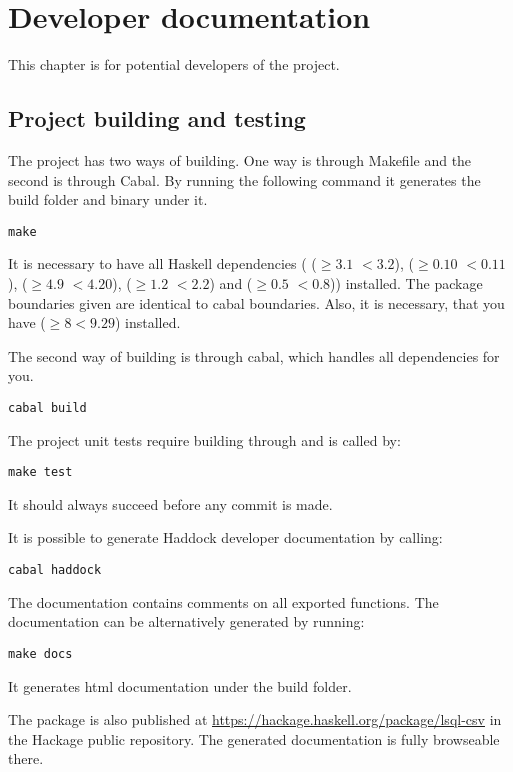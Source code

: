 \chapter{Developer documentation}
This chapter is for potential developers of the project.

\section{Project building and testing}
The project has two ways of building. One way is through Makefile and the second is through Cabal. 
By running the following command it generates the build folder and  binary under it.
\begin{verbatim}
make
\end{verbatim}
 
It is necessary to have all Haskell dependencies ( ($\geq 3.1$ $<3.2$),  ($\geq 0.10$ $<0.11$), 
 ($\geq 4.9$ $<4.20$),  ($\geq 1.2$ $<2.2$) and  ($\geq 0.5$ $<0.8$)) installed.
The package boundaries given are identical to cabal boundaries. Also, it is necessary, that you have  ($\geq 8 <9.29$) installed.

The second way of building is through cabal, which handles all dependencies for you.

\begin{verbatim}
cabal build
\end{verbatim}


The project unit tests require building through  and is called by:
\begin{verbatim}
make test
\end{verbatim}
It should always succeed before any commit is made.

It is possible to generate Haddock developer documentation by calling:
\begin{verbatim}
cabal haddock
\end{verbatim}

The documentation contains comments on all exported functions. The documentation can be alternatively generated
by running:

\begin{verbatim}
make docs
\end{verbatim}
It generates html documentation under the build folder.

The package is also published at \url{https://hackage.haskell.org/package/lsql-csv} in the Hackage public repository. 
The generated documentation is fully browseable there.

